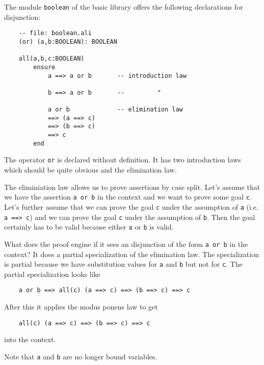The module \lstinline!boolean! of the basic library offers the following declarations
for disjunction:

\begin{lstlisting}
    -- file: boolean.ali
    (or) (a,b:BOOLEAN): BOOLEAN

    all(a,b,c:BOOLEAN)
        ensure
            a ==> a or b       -- introduction law

            b ==> a or b       --         "

            a or b             -- elimination law
            ==> (a ==> c)
            ==> (b ==> c)
            ==> c
        end
\end{lstlisting}

The operator \lstinline!or! is declared without definition. It has two
introduction laws which should be quite obvious and the elimination law.

The eliminiation law allows us to prove assertions by case split. Let's assume
that we have the assertion \lstinline!a or b! in the context and we want to
prove some goal \lstinline!c!. Let's further assume that we can prove the goal
\lstinline!c! under the assumption of \lstinline!a! (i.e. \lstinline!a ==> c!)
and we can prove the goal \lstinline!c! under the assumption of
\lstinline!b!. Then the goal certainly has to be valid because either
\lstinline!a!  or \lstinline!b! is valid.

What does the proof engine if it sees an disjunction of the form
\lstinline!a or b! in the context? It does a partial specialization of the
elimination law. The specialization is partial because we have substitution
values for \lstinline!a! and \lstinline!b!  but not for \lstinline!c!. The
partial specialization looks like

\begin{lstlisting}
    a or b ==> all(c) (a ==> c) ==> (b ==> c) ==> c
\end{lstlisting}

After this it applies the modus ponens law to get
\begin{lstlisting}
    all(c) (a ==> c) ==> (b ==> c) ==> c
\end{lstlisting}
into the context.


Note that \lstinline!a! and \lstinline!b! are no longer bound variables.





